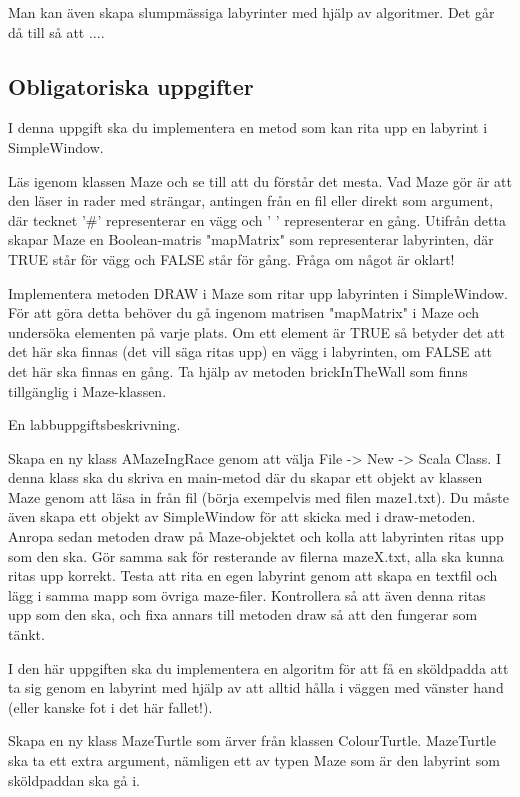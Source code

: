 Man kan även skapa slumpmässiga labyrinter med hjälp av algoritmer. Det går då till så att ....


\subsection{Obligatoriska uppgifter}

\Task I denna uppgift ska du implementera en metod som kan rita upp en labyrint i SimpleWindow.

\Subtask Läs igenom klassen Maze och se till att du förstår det mesta. Vad Maze gör är att den läser in rader med strängar, antingen från en fil eller direkt som argument, där tecknet '\#' representerar en vägg och ' ' representerar en gång. Utifrån detta skapar Maze en Boolean-matris "mapMatrix" som representerar labyrinten, där TRUE står för vägg och FALSE står för gång. Fråga om något är oklart!

\Subtask Implementera metoden DRAW i Maze som ritar upp labyrinten i SimpleWindow. För att göra detta behöver du gå ingenom matrisen "mapMatrix" i Maze och undersöka elementen på varje plats. Om ett element är TRUE så betyder det att det här ska finnas (det vill säga ritas upp) en vägg i labyrinten, om FALSE att det här ska finnas en gång. Ta hjälp av metoden brickInTheWall som finns tillgänglig i Maze-klassen.

\Task En labbuppgiftsbeskrivning.

\Subtask Skapa en ny klass AMazeIngRace genom att välja File -> New -> Scala Class. I denna klass ska du skriva en main-metod där du skapar ett objekt av klassen Maze genom att läsa in från fil (börja exempelvis med filen maze1.txt). Du måste även skapa ett objekt av SimpleWindow för att skicka med i draw-metoden. Anropa sedan metoden draw på Maze-objektet och kolla att labyrinten ritas upp som den ska. Gör samma sak för resterande av filerna mazeX.txt, alla ska kunna ritas upp korrekt. Testa att rita en egen labyrint genom att skapa en textfil och lägg i samma mapp som övriga maze-filer. Kontrollera så att även denna ritas upp som den ska, och fixa annars till metoden draw så att den fungerar som tänkt.

\Task I den här uppgiften ska du implementera en algoritm för att få en sköldpadda att ta sig genom en labyrint med hjälp av att alltid hålla i väggen med vänster hand (eller kanske fot i det här fallet!).

\Subtask Skapa en ny klass MazeTurtle som ärver från klassen ColourTurtle. MazeTurtle ska ta ett extra argument, nämligen ett av typen Maze som är den labyrint som sköldpaddan ska gå i.

